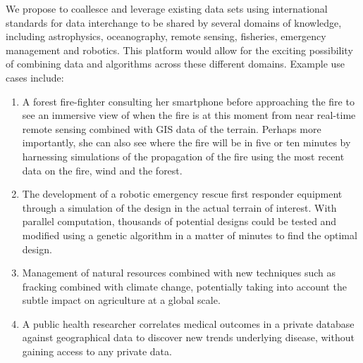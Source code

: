 We propose to coallesce and leverage existing data sets
using international standards for data interchange to be
shared by several domains of knowledge, including
astrophysics, oceanography, remote sensing, fisheries, emergency
management and robotics. This platform would allow for the exciting
possibility of combining data and algorithms across these different
domains. Example use cases include:
\begin{enumerate}
\item A forest fire-fighter consulting her smartphone before
approaching the fire to see an immersive view of when the fire is at
this moment from near real-time remote sensing combined with GIS
data of the terrain.  Perhaps more importantly, she can also see where
the fire will be in five or ten minutes by harnessing simulations of the
propagation of the fire using the most recent data on the fire, wind
and the forest.
\item The development of a robotic emergency rescue first responder
  equipment through a simulation of the design in the actual terrain
  of interest.  With parallel computation, thousands of potential
  designs could be tested and modified using a genetic algorithm in a
  matter of minutes to find the optimal design.
\item Management of natural resources combined with new techniques
such as fracking combined with climate change, potentially taking into account
the subtle impact on agriculture at a global scale.
\item A public health researcher correlates medical outcomes in a
  private database against geographical data to discover new trends
  underlying disease, without gaining access to any private data.
\end{enumerate}
